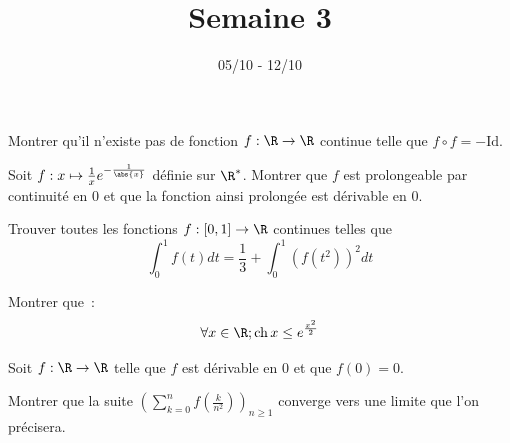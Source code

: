 \documentclass[11pt,a4paper]{article}
\begin{document}
\title{Semaine 3}
\author{}
\date{05/10 - 12/10 }

\maketitle


\begin{exercise}
Montrer qu'il n'existe pas de fonction $f:\R\to \R$ continue telle que
$f\circ f=-\text{Id}$.
\end{exercise}

\begin{exercise}
Soit $f:x\mapsto \frac{1}{x}e^{-\frac{1}{\abs{x}}}$ définie sur $\R^*$.
Montrer que $f$ est prolongeable par continuité en $0$ et que la fonction ainsi prolongée est dérivable en $0$.
\end{exercise}

\begin{exercise}
Trouver toutes les fonctions $f:[0,1]\to \R$ continues telles que 
$$\int_0^1 f(t)dt=\frac{1}{3}+\int_0^1(f(t^2))^2dt$$
\end{exercise}

\begin{exercise}
Montrer que~:
\[\forall x \in \R; \mathrm{ch}\,x \leq e^{\frac{x^2}{2}}\]
\end{exercise}

\begin{exercise}
Soit $f : \R \rightarrow \R$ telle que $f$ est dérivable en 0 et que $f(0)=0$.

Montrer que la suite $\left(\displaystyle\sum_{k=0}^n {f \left( \frac{k}{n^2}\right)}\right)_{n \geq 1}$ converge vers une limite que l'on précisera.
\end{exercise}
\end{document}
